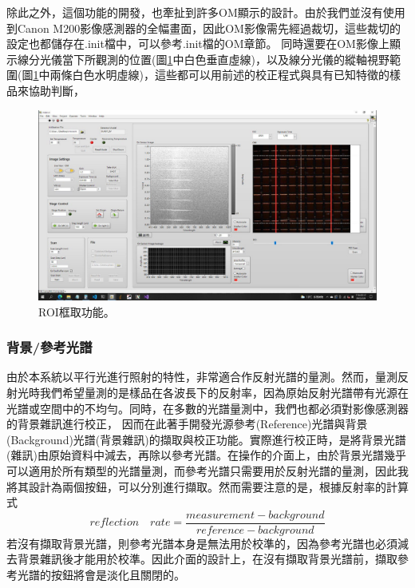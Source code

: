 \documentclass[12pt]{article}
\begin{document}
除此之外，這個功能的開發，也牽扯到許多OM顯示的設計。由於我們並沒有使用到Canon M200影像感測器的全幅畫面，因此OM影像需先經過裁切，這些裁切的設定也都儲存在.init檔中，可以參考.init檔的OM章節。
同時還要在OM影像上顯示線分光儀當下所觀測的位置(圖\ref{figure: roi}中白色垂直虛線)，以及線分光儀的縱軸視野範圍(圖\ref{figure: roi}中兩條白色水明虛線)，這些都可以用前述的校正程式與具有已知特徵的樣品來協助判斷，
\begin{figure}
    \centering
    \includegraphics[width=\linewidth]{roi.jpeg}
    \caption{ROI框取功能。}
    \label{figure: roi}
\end{figure}

\subsubsection{背景/參考光譜} \label{sec: bkg/ref}
由於本系統以平行光進行照射的特性，非常適合作反射光譜的量測。然而，量測反射光時我們希望量測的是樣品在各波長下的反射率，因為原始反射光譜帶有光源在光譜或空間中的不均勻。同時，在多數的光譜量測中，我們也都必須對影像感測器的背景雜訊進行校正，
因而在此著手開發光源參考(Reference)光譜與背景(Background)光譜(背景雜訊)的擷取與校正功能。實際進行校正時，是將背景光譜(雜訊)由原始資料中減去，再除以參考光譜。在操作的介面上，由於背景光譜幾乎可以適用於所有類型的光譜量測，而參考光譜只需要用於反射光譜的量測，因此我將其設計為兩個按鈕，可以分別進行擷取。然而需要注意的是，根據反射率的計算式
\begin{equation}\label{equation: reflection}
    reflection \quad rate=\frac{measurement-background}{reference-background}
\end{equation}
若沒有擷取背景光譜，則參考光譜本身是無法用於校準的，因為參考光譜也必須減去背景雜訊後才能用於校準。因此介面的設計上，在沒有擷取背景光譜前，擷取參考光譜的按鈕將會是淡化且關閉的。
\end{document}
